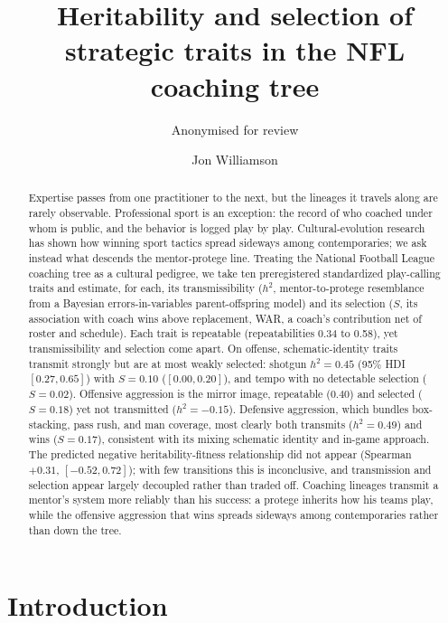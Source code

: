 \documentclass[
  journal=ehs,
  manuscript=article,
  year=2026,
  volume=8,
]{cup-journal}
\title{Heritability and selection of strategic traits in the NFL coaching tree}
\author{Anonymised for review}
\affiliation{Affiliation removed for anonymous review}
\author{Jon Williamson}
\affiliation{Williamson Consulting Group, USA}
\begin{document}
\begin{abstract}
Expertise passes from one practitioner to the next, but the lineages it travels
along are rarely observable. Professional sport is an exception: the record of who
coached under whom is public, and the behavior is logged play by play.
Cultural-evolution research has shown how winning sport tactics spread sideways among
contemporaries; we ask instead what descends the mentor-protege line. Treating the
National Football League coaching tree as a cultural pedigree, we take ten
preregistered standardized play-calling traits and estimate, for each, its
transmissibility ($h^{2}$, mentor-to-protege resemblance from a Bayesian
errors-in-variables parent-offspring model) and its selection ($S$,
its association with coach wins above replacement, WAR, a coach's contribution net of
roster and schedule). Each trait is repeatable (repeatabilities 0.34 to 0.58), yet
transmissibility and selection come apart. On offense, schematic-identity traits transmit strongly but are at most weakly
selected: shotgun $h^{2}=0.45$ (95\% HDI $[0.27,0.65]$) with $S=0.10$ ($[0.00,0.20]$),
and tempo with no detectable selection ($S=0.02$). Offensive
aggression is the mirror image, repeatable ($0.40$) and selected ($S=0.18$) yet not
transmitted ($h^{2}=-0.15$). Defensive aggression, which bundles box-stacking, pass
rush, and man coverage, most clearly both transmits ($h^{2}=0.49$) and wins ($S=0.17$),
consistent with its mixing schematic identity and in-game approach. The predicted
negative heritability-fitness relationship did not appear (Spearman $+0.31$,
$[-0.52,0.72]$); with few transitions this is inconclusive, and transmission and
selection appear largely decoupled rather than traded off. Coaching lineages transmit
a mentor's system more reliably than his success: a protege inherits how his teams
play, while the offensive aggression that wins spreads sideways among contemporaries
rather than down the tree.
\end{abstract}

\section{Introduction}
\end{document}
